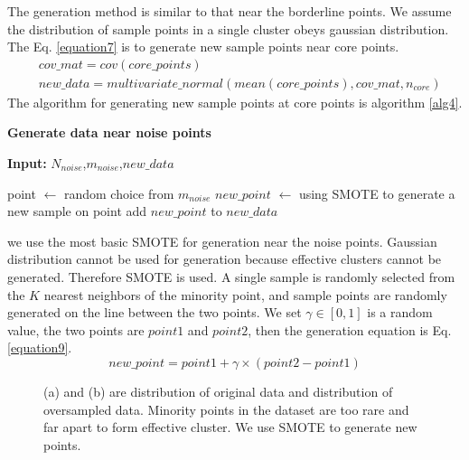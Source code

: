 \documentclass[ida]{iosart2x}
\begin{document}
The generation method is similar to that near the borderline points. 
We assume the distribution of sample points in a single cluster obeys gaussian distribution.
The Eq. \ref{equation7} is to generate new sample points near core points.
\begin{equation}
  \label{equation7}
  \begin{aligned}
    & cov\_mat=cov(core\_points) \\
    & new\_data=multivariate\_normal(mean(core\_points),cov\_mat,n_{core})
  \end{aligned}
\end{equation}
The algorithm for generating new sample points at core points is algorithm \ref{alg4}.

\textbf{Generate data near noise points}
\begin{algorithm}[tb]
  \caption{$generate\_noise$}
  \label{alg5}
  \hspace*{0.02in} {\bf Input:} $N_{noise}$,$m_{noise}$,$new\_data$
  \begin{algorithmic}
    \State point $\leftarrow$ random choice from $m_{noise}$
    \State $new\_point$ $\leftarrow$ using SMOTE to generate a new sample on point
    \State add $new\_point$ to $new\_data$
    \EndFor
  \end{algorithmic}
\end{algorithm}
we use the most basic SMOTE for generation near the noise points.
Gaussian distribution cannot be used for generation because effective clusters cannot be generated. 
Therefore SMOTE is used.
A single sample is randomly selected from the $K$ nearest neighbors of the minority point, 
 and sample points are randomly generated on the line between the two points.
 We set $\gamma \in [0,1]$ is a random value, the two points are $point1$ and $point2$,
 then the generation equation is Eq. \ref{equation9}.
 \begin{equation}
  \label{equation9}
  new\_point=point1+\gamma \times (point2-point1)
\end{equation}

\begin{figure}[tb]
  \centering
  \quad
  \caption{(a) and (b) are distribution of original data and distribution of oversampled data.
  Minority points in the dataset are too rare and far apart to form effective cluster. 
  We use SMOTE to generate new points.}
  \label{fig14}
  \end{figure}
\end{document}
